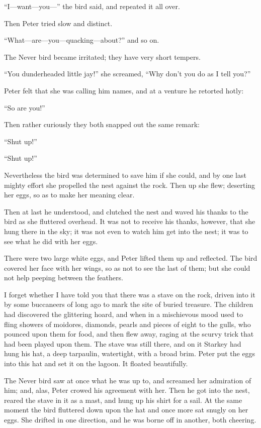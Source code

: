 ``I---want—you—'' the bird said, and repeated it all over.

Then Peter tried slow and distinct.

``What---are—you—quacking—about?'' and so on.

The Never bird became irritated; they have very short tempers.

``You dunderheaded little jay!'' she screamed, ``Why don't you do as I
tell you?''

Peter felt that she was calling him names, and at a venture he retorted
hotly:

``So are you!''

Then rather curiously they both snapped out the same remark:

``Shut up!''

``Shut up!''

Nevertheless the bird was determined to save him if she could, and by
one last mighty effort she propelled the nest against the rock. Then up
she flew; deserting her eggs, so as to make her meaning clear.

Then at last he understood, and clutched the nest and waved his thanks
to the bird as she fluttered overhead. It was not to receive his
thanks, however, that she hung there in the sky; it was not even to
watch him get into the nest; it was to see what he did with her eggs.

There were two large white eggs, and Peter lifted them up and
reflected. The bird covered her face with her wings, so as not to see
the last of them; but she could not help peeping between the feathers.

I forget whether I have told you that there was a stave on the rock,
driven into it by some buccaneers of long ago to mark the site of
buried treasure. The children had discovered the glittering hoard, and
when in a mischievous mood used to fling showers of moidores, diamonds,
pearls and pieces of eight to the gulls, who pounced upon them for
food, and then flew away, raging at the scurvy trick that had been
played upon them. The stave was still there, and on it Starkey had hung
his hat, a deep tarpaulin, watertight, with a broad brim. Peter put the
eggs into this hat and set it on the lagoon. It floated beautifully.

The Never bird saw at once what he was up to, and screamed her
admiration of him; and, alas, Peter crowed his agreement with her. Then
he got into the nest, reared the stave in it as a mast, and hung up his
shirt for a sail. At the same moment the bird fluttered down upon the
hat and once more sat snugly on her eggs. She drifted in one direction,
and he was borne off in another, both cheering.

